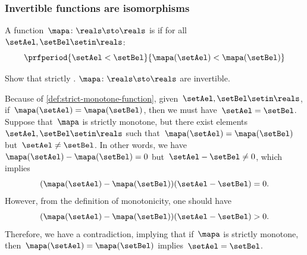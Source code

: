 {\subsubsection{Invertible functions are isomorphisms}
\begin{definition}
    \label{def:strict-monotone-function}
    A function~$\mapa\colon \reals \sto \reals$ is  if for all~$\setAel,\setBel\setin \reals$:
    \begin{equation}
        \prfperiod{\setAel < \setBel}{\mapa(\setAel)<\mapa(\setBel)}
    \end{equation}
\end{definition}
\begin{exercise}
    Show that strictly .
    $\mapa\colon \reals \sto \reals$ are invertible.
\end{exercise}
\begin{solution}
    Because of \cref{def:strict-monotone-function}, given~$\setAel,\setBel\setin \reals$, if~$\mapa(\setAel)=\mapa(\setBel)$, then we must have~$\setAel=\setBel$.
    Suppose that~$\mapa$ is strictly monotone, but there exist elements~$\setAel,\setBel\setin \reals$ such that~$\mapa(\setAel)=\mapa(\setBel)$ but~$\setAel\neq \setBel$.
    In other words, we have~$\mapa(\setAel)-\mapa(\setBel)=0$ but~$\setAel-\setBel\neq 0$, which implies
    \begin{equation}
        (\mapa(\setAel)-\mapa(\setBel))(\setAel-\setBel)=0.
    \end{equation}
    However, from the definition of monotonicity, one should have
    \begin{equation}
        (\mapa(\setAel)-\mapa(\setBel))(\setAel-\setBel)>0.
    \end{equation}
    Therefore, we have a contradiction, implying that if~$\mapa$ is strictly monotone, then~$\mapa(\setAel)=\mapa(\setBel)$ implies~$\setAel=\setBel$.
\end{solution}


}
